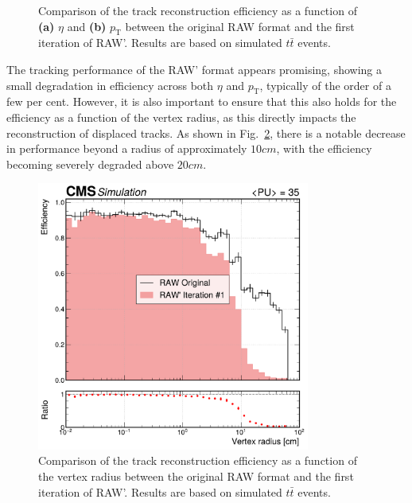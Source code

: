 \begin{figure}[!htbp]
\begin{subfigure}[b]{0.49\textwidth}
            \caption{}
        \end{subfigure}
    \caption[Comparison of the track reconstruction efficiency as a function of $\eta$ and $p_\mathrm{T}$ between the original RAW format and the first iteration of RAW'.]{Comparison of the track reconstruction efficiency as a function of \textbf{(a)} $\eta$ and \textbf{(b)} $p_\mathrm{T}$ between the original RAW format and the first iteration of RAW'. Results are based on simulated $t\bar{t}$ events.} 
    \label{Figure:Chapter5_TrackingPerformance_1}
\end{figure}

The tracking performance of the RAW' format appears promising, showing a small degradation in efficiency across both $\eta$ and $p_\mathrm{T}$, typically of the order of a few per cent. However, it is also important to ensure that this also holds for the efficiency as a function of the vertex radius, as this directly impacts the reconstruction of displaced tracks. As shown in Fig.~\ref{Figure:Chapter5_TrackingPerformance_vertexPos_1}, there is a notable decrease in performance beyond a radius of approximately $10\unit{cm}$, with the efficiency becoming severely degraded above $20\unit{cm}$. 

\begin{figure}[!htbp]
\centering
\includegraphics[width=0.8\textwidth]{Figures/Chapter5/efficiency_comparison_1_vertpos.pdf}
\caption[Comparison of the track reconstruction efficiency as a function of the vertex radius between the original RAW format and the first iteration of RAW'.]{Comparison of the track reconstruction efficiency as a function of the vertex radius between the original RAW format and the first iteration of RAW'. Results are based on simulated $t\bar{t}$ events.} 
\label{Figure:Chapter5_TrackingPerformance_vertexPos_1}
\end{figure}

